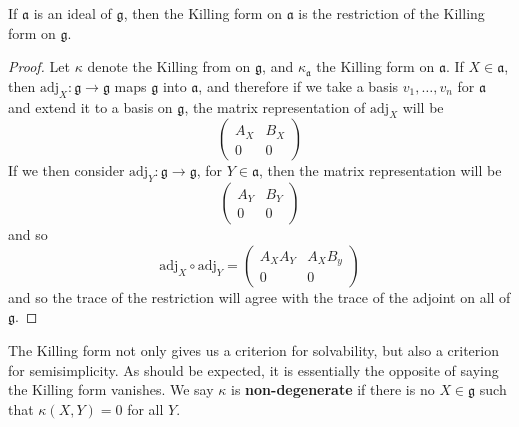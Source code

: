 \begin{lemma}
    If $\mathfrak{a}$ is an ideal of $\mathfrak{g}$, then the Killing form on $\mathfrak{a}$ is the restriction of the Killing form on $\mathfrak{g}$.
\end{lemma}
\begin{proof}
    Let $\kappa$ denote the Killing from on $\mathfrak{g}$, and $\kappa_\mathfrak{a}$ the Killing form on $\mathfrak{a}$. If $X \in \mathfrak{a}$, then $\text{adj}_X: \mathfrak{g} \to \mathfrak{g}$ maps $\mathfrak{g}$ into $\mathfrak{a}$, and therefore if we take a basis $v_1, \dots, v_n$ for $\mathfrak{a}$ and extend it to a basis on $\mathfrak{g}$, the matrix representation of $\text{adj}_X$ will be
    \[ \begin{pmatrix} A_X & B_X \\ 0 & 0 \end{pmatrix} \]
    If we then consider $\text{adj}_Y: \mathfrak{g} \to \mathfrak{g}$, for $Y \in \mathfrak{a}$, then the matrix representation will be
    \[ \begin{pmatrix} A_Y & B_Y \\ 0 & 0 \end{pmatrix} \]
    and so
    \[ \text{adj}_X \circ \text{adj}_Y = \begin{pmatrix} A_XA_Y & A_XB_y \\ 0 & 0 \end{pmatrix} \]
    and so the trace of the restriction will agree with the trace of the adjoint on all of $\mathfrak{g}$.
\end{proof}

The Killing form not only gives us a criterion for solvability, but also a criterion for semisimplicity. As should be expected, it is essentially the opposite of saying the Killing form vanishes. We say $\kappa$ is {\bf non-degenerate} if there is no $X \in \mathfrak{g}$ such that $\kappa(X,Y) = 0$ for all $Y$.

